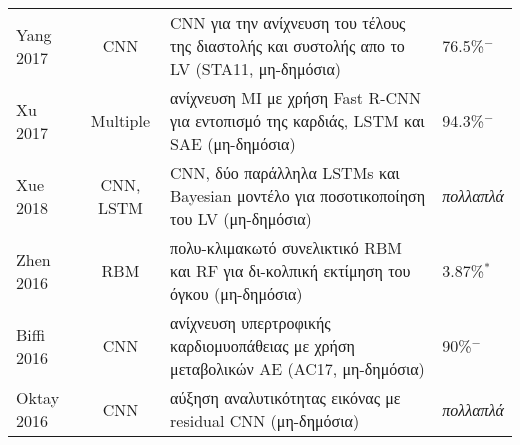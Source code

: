 \begin{sidewaystable}
\begin{tabular}{l c l l}
		Yang 2017~\cite{yang2017convolutional}     & CNN             & CNN για την ανίχνευση του τέλους της διαστολής και συστολής απο το LV (STA11, μη-δημόσια)       & 76.5\%$^-$                                                                                                                                                                                                                                      \\
		Xu 2017~\cite{xu2017direct}                & Multiple        & ανίχνευση MI με χρήση Fast R-CNN για εντοπισμό της καρδιάς, LSTM και SAE (μη-δημόσια)           & 94.3\%$^-$                                                                                                                                                                                                                                      \\
		Xue 2018~\cite{xue2018full}                & CNN, LSTM       & CNN, δύο παράλληλα LSTMs και Bayesian μοντέλο για ποσοτικοποίηση του LV (μη-δημόσια) & \textit{πολλαπλά}                                                                                                                                                                                                                               \\
		Zhen 2016~\cite{zhen2016multi}             & RBM             & πολυ-κλιμακωτό συνελικτικό RBM και RF για δι-κολπική εκτίμηση του όγκου (μη-δημόσια)            & 3.87\%$^*$                                                                                                                                                                                                                                      \\
		Biffi 2016~\cite{biffi2018learning}        & CNN             & ανίχνευση υπερτροφικής καρδιομυοπάθειας με χρήση μεταβολικών AE (AC17, μη-δημόσια)              & 90\%$^-$                                                                                                                                                                                                                                        \\
		Oktay 2016~\cite{oktay2016multi}           & CNN             & αύξηση αναλυτικότητας εικόνας με residual CNN (μη-δημόσια)                                      & \textit{πολλαπλά}                                                                                                                                                                                                                               \\
		\bottomrule
	\end{tabular}
\end{sidewaystable}

